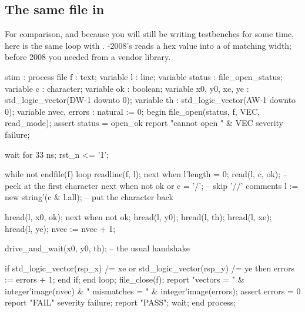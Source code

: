 \subsection{The same file in \VHDL{}}

For comparison, and because you will still be writing \VHDL{} testbenches for
some time, here is the same loop with . \VHDL{}-2008's
 reads a hex value into a  of matching
width; before 2008 you needed  from a vendor
library.

\begin{vhdlcode}[caption={The same vector file read with \code{std.textio}
(\file{tb\_vec\_vhdl.vhd}).},label={lst:python:textio}]
  stim : process
    file     f      : text;
    variable l      : line;
    variable status : file_open_status;
    variable c      : character;
    variable ok     : boolean;
    variable x0, y0, xe, ye : std_logic_vector(DW-1 downto 0);
    variable th             : std_logic_vector(AW-1 downto 0);
    variable nvec, errors   : natural := 0;
  begin
    file_open(status, f, VEC, read_mode);
    assert status = open_ok report "cannot open " & VEC severity failure;

    wait for 33 ns;
    rst_n <= '1';

    while not endfile(f) loop
      readline(f, l);
      next when l'length = 0;
      read(l, c, ok);                       -- peek at the first character
      next when not ok or c = '/';          -- skip '//' comments
      l := new string'(c & l.all);          -- put the character back

      hread(l, x0, ok); next when not ok;
      hread(l, y0);
      hread(l, th);
      hread(l, xe);
      hread(l, ye);
      nvec := nvec + 1;

      drive_and_wait(x0, y0, th);          -- the usual handshake

      if std_logic_vector(rsp_x) /= xe or std_logic_vector(rsp_y) /= ye then
        errors := errors + 1;
      end if;
    end loop;
    file_close(f);
    report "vectors = " & integer'image(nvec) &
           "  mismatches = " & integer'image(errors);
    assert errors = 0 report "FAIL" severity failure;
    report "PASS";
    wait;
  end process;
\end{vhdlcode}


